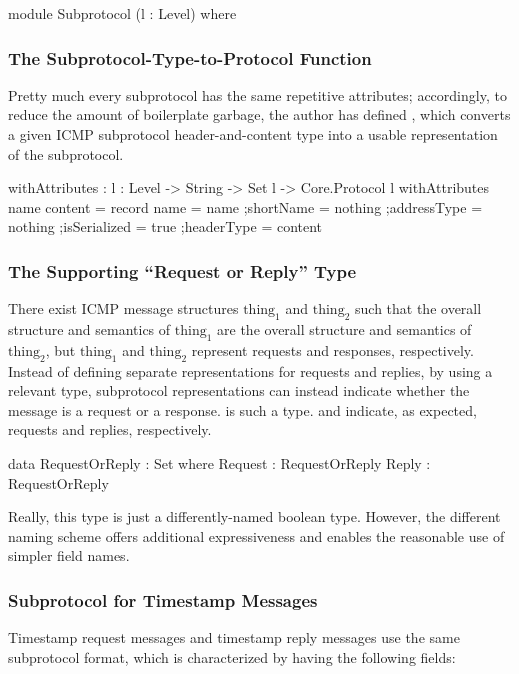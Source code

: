 \documentclass{report}
\begin{document}
\begin{code}
  module Subprotocol (l : Level) where
\end{code}

\subsubsection{The Subprotocol-Type-to-Protocol Function}
Pretty much every subprotocol has the same repetitive  attributes; accordingly, to reduce the amount of boilerplate garbage, the author has defined , which converts a given ICMP subprotocol header-and-content type into a usable representation of the subprotocol.

\begin{code}
    withAttributes : {l : Level} -> String -> Set l -> Core.Protocol l
    withAttributes name content = record
      {name = name
      ;shortName = nothing
      ;addressType = nothing
      ;isSerialized = true
      ;headerType = content
      }
\end{code}

\subsubsection{The Supporting ``Request or Reply'' Type}
There exist ICMP message structures \(\mathrm{thing}_1\) and \(\mathrm{thing}_2\) such that the overall structure and semantics of \(\mathrm{thing}_1\) are the overall structure and semantics of \(\mathrm{thing}_2\), but \(\mathrm{thing}_1\) and \(\mathrm{thing}_2\) represent requests and responses, respectively.  Instead of defining separate representations for requests and replies, by using a relevant type, subprotocol representations can instead indicate whether the message is a request or a response.   is such a type.   and  indicate, as expected, requests and replies, respectively.

\begin{code}
    data RequestOrReply : Set where
      Request : RequestOrReply
      Reply : RequestOrReply
\end{code}

Really, this type is just a differently-named boolean type.  However, the different naming scheme offers additional expressiveness and enables the reasonable use of simpler field names.

\subsubsection{Subprotocol for Timestamp Messages}
Timestamp request messages and timestamp reply messages use the same subprotocol format, which is characterized by having the following fields:
\end{document}
